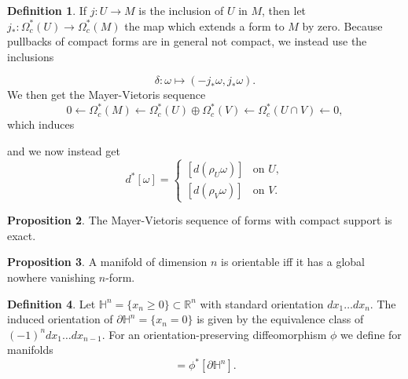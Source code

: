 \documentclass[twocolumn]{article}
\theoremstyle{definition}
\newtheorem{definition}{Definition}[section]
\newtheorem{proposition}[definition]{Proposition}
\theoremstyle{remark}
\begin{document}
\begin{definition}
    If $j: U \rightarrow M$ is the inclusion of $U$ in $M$, then let $j_*: \Omega^*_c(U) \rightarrow \Omega^*_c(M)$ the map which extends a form to $M$ by zero.
    Because pullbacks of compact forms are in general not compact, we instead use the inclusions

    \begin{center}
    \end{center}
    \begin{equation}
        \delta: \omega \mapsto (-j_*\omega, j_*\omega).
    \end{equation}
    We then get the Mayer-Vietoris sequence
    \begin{equation}
        0 \leftarrow \Omega^*_c(M) \leftarrow \Omega^*_c(U) \oplus \Omega^*_c(V) \leftarrow \Omega^*_c(U \cap V) \leftarrow 0,
    \end{equation}
    which induces
    \begin{center}
    \end{center}
    and we now instead get
    \begin{equation}
        d^*[\omega] = 
        \begin{cases}
            [d(\rho_U\omega)] & \textrm{on } U,\\
            [d(\rho_V\omega)] & \textrm{on } V.
        \end{cases}
    \end{equation}
\end{definition}
\begin{proposition}
    The Mayer-Vietoris sequence of forms with compact support is exact.
\end{proposition}
\begin{proposition}
    A manifold of dimension $n$ is orientable iff it has a global nowhere vanishing $n$-form.
\end{proposition}
\begin{definition}
    Let $\mathbb{H}^n = \{x_n \geq 0 \} \subset \mathbb{R}^n$ with standard orientation $dx_1\dots dx_n$.
    The induced orientation of $\partial \mathbb{H}^n = \{x_n=0\}$ is given by the equivalence class of $(-1)^n dx_1 \dots dx_{n-1}$.
    For an orientation-preserving diffeomorphism $\phi$ we define for manifolds
    \begin{equation}
        [\partial M] = \phi^*[\partial \mathbb{H}^n].
    \end{equation}
\end{definition}
\end{document}

